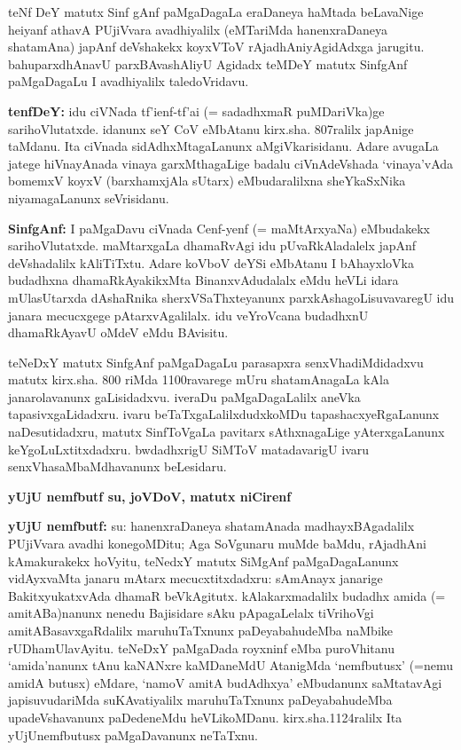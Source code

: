 teNf DeY matutx Sinf gAnf paMgaDagaLa eraDaneya haMtada beLavaNige heiyanf athavA PUjiVvara avadhiyalilx (eMTariMda hanenxraDaneya shatamAna) japAnf deVshakekx koyxVToV rAjadhAniyAgidAdxga jarugitu. bahuparxdhAnavU parxBAvashAliyU Agidadx teMDeY matutx SinfgAnf paMgaDagaLu I avadhiyalilx taledoVridavu.

{\bf tenfDeY:} idu ciVNada tf'ienf-tf'ai (= sadadhxmaR puMDariVka)ge sarihoVlu\-tatxde. idanunx seY CoV eMbAtanu kirx.sha. 807ralilx japAnige taMdanu. Ita ciVnada sidAdhxMtagaLanunx aMgiVkarisidanu. Adare avugaLa jatege hiVnayAnada vinaya garxMthagaLige badalu ciVnAdeVshada `vinaya'vAda bomemxV koyxV (barxhamxjAla sUtarx) eMbudaralilxna sheYkaSxNika niyamagaLanunx seVrisidanu.

{\bf SinfgAnf:} I paMgaDavu ciVnada Cenf-yenf (= maMtArxyaNa) eMbudakekx sarihoVlutatxde. maMtarxgaLa dhamaRvAgi idu pUvaRkAladalelx japAnf deVshadalilx kAliTiTxtu. Adare koVboV deYSi eMbAtanu I bAhayxloVka budadhxna dhamaRkAyakikxMta BinanxvAdudalalx eMdu heVLi idara mUlasUtarxda dAshaRnika sherxVSaThxteyanunx parxkAshagoLisuvavaregU idu janara mecucxgege pAtarxvAgalilalx. idu veYroVcana budadhxnU dhamaRkAyavU oMdeV eMdu BAvisitu.

teNeDxY matutx SinfgAnf paMgaDagaLu parasapxra senxVhadiMdidadxvu matutx kirx.sha. 800 riMda 1100ravarege mUru shatamAnagaLa kAla janarolavanunx gaLisidadxvu. iveraDu paMgaDagaLalilx aneVka tapasivxgaLidadxru. ivaru beTaTxgaLalilxdudxkoMDu tapashacxyeRgaLanunx naDesutidadxru, matutx SinfToVgaLa pavitarx sAthxnagaLige yAterxgaLanunx keYgoLuLxtitxdadxru. bwdadhxrigU SiMToV matadavarigU ivaru senxVhasaMbaMdhavanunx beLesidaru.

\begin{center}
{\textbf{\Large yUjU nemfbutf su, joVDoV, matutx niCirenf}}
\end{center}

{\bf yUjU nemfbutf:} su: hanenxraDaneya shatamAnada madhayxBAgadalilx PUjiVvara avadhi konegoMDitu; Aga SoVgunaru muMde baMdu, rAjadhAni kAmakurakekx hoVyitu, teNedxY matutx SiMgAnf paMgaDagaLanunx vidAyxvaMta janaru mAtarx mecucxtitxdadxru: sAmAnayx janarige BakitxyukatxvAda dhamaR beVkAgitutx. kAlakarxmadalilx budadhx  amida (= amitABa)nanunx nenedu Bajisidare sAku pApagaLelalx tiVrihoVgi amitABasavxgaRdalilx maruhuTaTxnunx paDeyabahudeMba naMbike rUDhamUlavAyitu. teNeDxY paMgaDada royxninf eMba puroVhitanu `amida'nanunx tAnu kaNANxre kaMDaneMdU AtanigMda `nemfbutusx' (=nemu amidA butusx) eMdare, `namoV amitA budAdhxya' eMbudanunx saMtatavAgi japisuvudariMda suKAvatiyalilx maruhuTaTxnunx paDeyabahudeMba upadeVshavanunx paDedeneMdu heVLikoMDanu. kirx.sha.1124ralilx Ita yUjUnemfbutusx paMgaDavanunx neTaTxnu.

